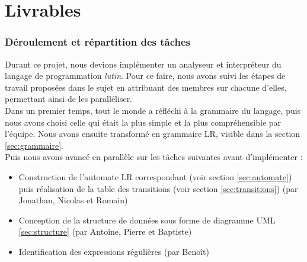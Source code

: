 





\tableofcontents

\listoffigures

\listoftables

\newpage

\part{Livrables}

\section{Déroulement et répartition des tâches}

Durant ce projet, nous devions implémenter un analyseur et interpréteur du langage de programmation \textit{lutin}. Pour ce faire, nous avons suivi les étapes de travail proposées dans le sujet en attribuant des membres sur chacune d'elles, permettant ainsi de les paralléliser. \\

Dans un premier temps, tout le monde a réfléchi à la grammaire du langage, puis nous avons choisi celle qui était la plus simple et la plus compréhensible par l'équipe. Nous avons ensuite transformé en grammaire LR, visible dans la section \ref{sec:grammaire}. \\

Puis nous avons avancé en parallèle sur les tâches suivantes avant d'implémenter :
\begin{itemize}
	\item Construction de l'automate LR correspondant (voir section \ref{sec:automate}) puis réalisation de la table des transitions (voir section \ref{sec:transitions}) (par Jonathan, Nicolas et Romain)
	\item Conception de la structure de données sous forme de diagramme UML \ref{sec:structure} (par Antoine, Pierre et Baptiste)
	\item Identification des expressions régulières (par Benoît) \\
\end{itemize}

